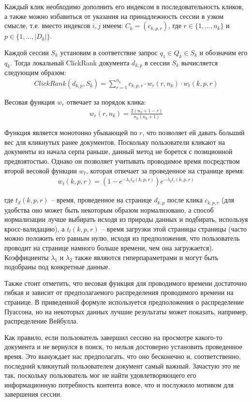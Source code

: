\documentclass[diploma]{nanolab2015}
\begin{document}
Каждый клик необходимо дополнить его индексом в последовательность кликов, а также можно избавиться от указания на принадлежность сессии в узком смысле, т.е. вместо индексов $i,j$ имеем: $C_k = (c_{k,p,r})$, где $r \in \{1, \dots, n_k\}$ и $p \in \{1, \dots, |D_k|\}$.

Каждой сессии $S_k$ установим в соответствие запрос $q_1 \in Q_k \in S_k$ и обозначим его $q_k$. Тогда локальный ClickRank \cite{clickrank} документа $d_{k,p}$ в сессии $S_k$ вычисляется следующим образом:
\begin{align}
    ClickRank(d_{k,p}, S_k) = \sum_{r=1}^{n_k} c_{k, p, r} \cdot w_r(r, n_k) \cdot w_t(k,p,r)
\end{align}

Весовая функция $w_r$ отвечает за порядок клика:
\begin{align}
    w_r(r, n_k) = \frac{2(n_k + 1 - r)}{n_k(n_k + 1)}
\end{align}

Функция является монотонно убывающей по $r$, что позволяет ей давать больший вес для кликнутых ранее документов. Поскольку пользователи кликают на документы из начала серпа раньше, данный метод не борется с позиционной предвзятостью. Однако он позволяет учитывать проводимое время посредством второй весовой функции $w_t$, которая отвечает за проведенное на странице время:
\begin{align}
    w_t(k,p,r) = (1 - e^{-\lambda_1 t_d(k,p,r)})e^{-\lambda_2 t_l(k,p,r)}
\end{align}

где $t_d(k,p,r)$ -- время, проведенное на странице $d_{k,p}$ после клика $c_{k,p,r}$ (для удобства оно может быть некоторым образом нормализовано, а способ нормализации лучше выбирать исходя из природы данных и подбирать, используя кросс-валидацию), а $t_l(k,p,r)$ -- время загрузки этой страницы страницы (часто можно положить его равным нулю, исходя из предположения, что пользователь проводит на странице намного больше времени, чем она загружается). Коэффициенты $\lambda_1$ и $\lambda_2$ также являются гиперпараметрами и могут быть подобраны под конкретные данные.

Также стоит отметить, что весовая функция для проводимого времени достаточно гибкая и зависит от предполагаемого распределения проводимого времени на странице. В приведенной формуле используется предположения о распределение Пуассона, но на некоторых данных лучшие результаты может показать, например, распределение Вейбулла.

Как правило, если пользователь завершил сессию на просмотре какого-то документа и не вернулся в поиск, то нельзя достоверно установить проведенное время. Это вынуждает нас предполагать, что оно бесконечно и, соответственно, последний кликнутый пользователем документ самый важный. Зачастую это не так, поскольку пользователь мог не найти удовлетворяющего его информационную потребность контента вовсе, что и послужило мотивом для завершения сессии.
\end{document}
